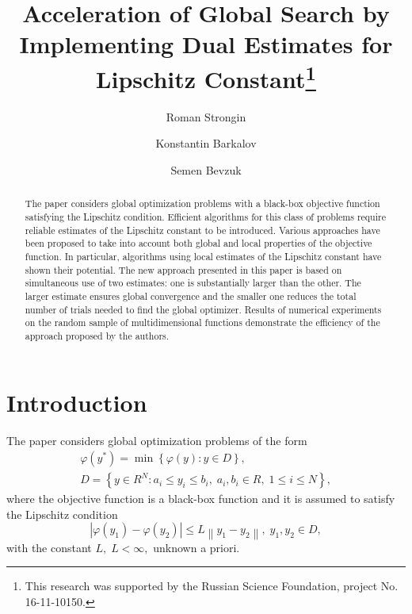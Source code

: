 \documentclass[runningheads]{llncs}
\begin{document}
%
\title{Acceleration of Global Search by Implementing Dual Estimates for Lipschitz Constant\thanks{This research was supported by the Russian Science Foundation, project No.\,16-11-10150.}}
%
%
\author{Roman Strongin 
\and Konstantin Barkalov 
\and Semen Bevzuk
}
%
%
%
\maketitle              %
%
\begin{abstract}
The paper considers global optimization problems with a black-box objective 
function satisfying the Lipschitz condition. Efficient algorithms for this 
class of problems require reliable estimates of the Lipschitz constant to be 
introduced. Various approaches have been proposed to take into account both
global and local properties of the objective function. In particular, algorithms
using local estimates of the Lipschitz constant have shown their potential.
The new approach presented in this paper is based on simultaneous use of two
estimates: one is substantially larger than the other. 
The larger estimate ensures global convergence and the smaller one reduces 
the total number of trials needed to find the global optimizer.
Results of numerical experiments on the random sample of multidimensional 
functions demonstrate the efficiency of the approach proposed by the authors.  

\end{abstract}
%
%
%
\section{Introduction}

The paper considers global optimization problems of the form 
\begin{gather}
 \varphi(y^\ast)=\min{\left\{\varphi(y):y\in D\right\}}, \label{problem}\\
 D=\left\{y\in R^N: a_i\leq y_i \leq b_i, \; a_i,b_i\in R, \;  1\leq i \leq N\right\} \label{D},
\end{gather}
where the objective function is a black-box function and it is assumed to satisfy the Lipschitz condition
\[
\left|\varphi(y_1)-\varphi(y_2)\right|\leq L\left\|y_1-y_2\right\|,\; y_1,y_2 \in D,
\]
with the constant $L, \; L<\infty,$ unknown a priori.
\end{document}

